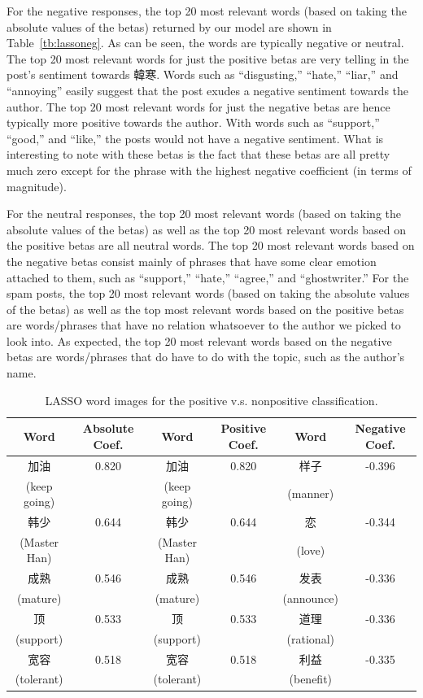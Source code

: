 \documentclass[11pt]{article}
\newcommand{\1}[1]{{\mathbf 1}\left\{#1\right\}}        %
\begin{document}
For the negative responses, the top 20 most relevant words (based on taking the absolute values of the betas) returned by our model are shown in Table~\ref{tb:lassoneg}. As can be seen, the words are typically negative or neutral.  The top 20 most relevant words for just the positive betas are very telling in the post's sentiment towards 韓寒. Words such as ``disgusting,'' ``hate,'' ``liar,'' and ``annoying'' easily suggest that the post exudes a negative sentiment towards the author. The top 20 most relevant words for just the negative betas are hence typically more positive towards the author. With words such as ``support,'' ``good,'' and ``like,'' the posts would not have a negative sentiment. What is interesting to note with these betas is the fact that these betas are all pretty much zero except for the phrase with the highest negative coefficient (in terms of magnitude). 

For the neutral responses, the top 20 most relevant words (based on taking the absolute values of the betas) as well as the top 20 most relevant words based on the positive betas are all neutral words. The top 20 most relevant words based on the negative betas consist mainly of phrases that have some clear emotion attached to them, such as ``support,'' ``hate,'' ``agree,'' and ``ghostwriter.'' For the spam posts, the top 20 most relevant words (based on taking the absolute values of the betas) as well as the top most relevant words based on the positive betas are words/phrases that have no relation whatsoever to the author we picked to look into.  As expected, the top 20 most relevant words based on the negative betas are words/phrases that do have to do with the topic, such as the author's name. 


\begin{table}
\caption{LASSO word images for the positive v.s. nonpositive classification.}
\begin{center}
\begin{tabular}{|c|c||c|c||c|c|}
\hline
Word & Absolute Coef. & Word & Positive Coef. & Word & Negative Coef.\\ \hline \hline
加油 & 0.820 & 加油 & 0.820 & 样子 & -0.396\\
(keep going) & & (keep going) & & (manner) & \\\hline
韩少 & 0.644 & 韩少 & 0.644 & 恋 & -0.344\\
(Master Han) & & (Master Han) & & (love) & \\\hline
成熟 & 0.546 & 成熟 & 0.546 & 发表 & -0.336\\
(mature) & & (mature) & & (announce) & \\\hline
顶 & 0.533 & 顶 & 0.533 & 道理 & -0.336\\
(support) & & (support) & & (rational) & \\\hline
宽容 & 0.518 & 宽容 & 0.518 & 利益 & -0.335\\
(tolerant) & & (tolerant) & & (benefit) & \\\hline
\end{tabular}
\label{tb:lassopos}
\end{center}
\end{table}
\end{document}
